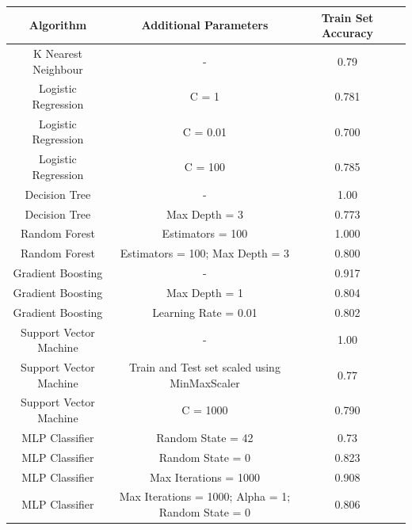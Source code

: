 \documentclass[12pt]{article}
\begin{document}
{
\clearpage
\thispagestyle{empty}
\begin{landscape}
\centering
\begin{table}[]
\centering
\begin{tabular}{|c|c|c|c|}
\hline
Algorithm              & Additional Parameters                              & Train Set Accuracy \\ \hline
K Nearest Neighbour    & -                                                  & 0.79               \\ \hline
Logistic Regression    & C = 1                                              & 0.781              \\ \hline
Logistic Regression    & C = 0.01                                           & 0.700              \\\hline
Logistic Regression    & C = 100                                            & 0.785              \\ \hline
Decision Tree          & -                                                  & 1.00               \\ \hline
Decision Tree          & Max Depth = 3                                      & 0.773              \\ \hline
Random Forest          & Estimators = 100                                   & 1.000              \\ \hline
Random Forest          & Estimators = 100; Max Depth = 3                    & 0.800              \\ \hline
Gradient Boosting      & -                                                  & 0.917              \\ \hline
Gradient Boosting      & Max Depth = 1                                      & 0.804              \\ \hline
Gradient Boosting      & Learning Rate = 0.01                               & 0.802              \\ \hline
Support Vector Machine & -                                                  & 1.00               \\ \hline
Support Vector Machine & Train and Test set scaled using MinMaxScaler       & 0.77               \\ \hline
Support Vector Machine & C = 1000                                           & 0.790              \\ \hline
MLP Classifier         & Random State = 42                                  & 0.73               \\ \hline
MLP Classifier         & Random State = 0                                   & 0.823              \\ \hline
MLP Classifier         & Max Iterations = 1000                              & 0.908              \\ \hline
MLP Classifier         & Max Iterations = 1000; Alpha = 1; Random State = 0 & 0.806              \\ \hline
\end{tabular}
\end{table}
\label{table:2}
\end{landscape}
\clearpage
}
\end{document}
